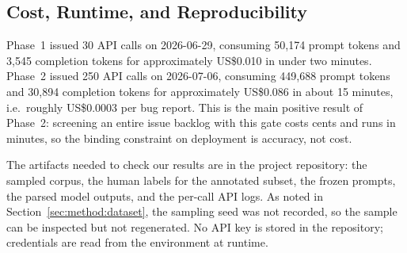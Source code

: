 \subsection{Cost, Runtime, and Reproducibility}
\label{sec:method:repro}

Phase~1 issued 30 API calls on 2026-06-29, consuming 50{,}174 prompt
tokens and 3{,}545 completion tokens for approximately US\$0.010 in
under two minutes. Phase~2 issued 250 API calls on 2026-07-06,
consuming 449{,}688 prompt tokens and 30{,}894 completion tokens for
approximately US\$0.086 in about 15 minutes, i.e.\ roughly US\$0.0003
per bug report. This is the main positive result of Phase~2: screening
an entire issue backlog with this gate costs cents and runs in minutes,
so the binding constraint on deployment is accuracy, not cost.

The artifacts needed to check our results are in the project
repository: the sampled corpus, the human labels for the annotated
subset, the frozen prompts, the parsed model outputs, and the per-call
API logs. As noted in Section~\ref{sec:method:dataset}, the sampling
seed was not recorded, so the sample can be inspected but not
regenerated. No API key is stored in the repository; credentials are
read from the environment at runtime.
